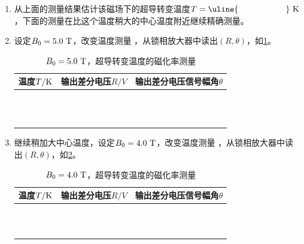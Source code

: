 \documentclass[11pt,a4paper]{ctexart}
\newcommand{\unit}[1]{\rm \ #1}
\begin{document}
\begin{enumerate}
 \item
 从上面的测量结果估计该磁场下的超导转变温度$T = \uline{\hspace{20mm}}\unit{K}$，下面的测量在比这个温度稍大的中心温度附近继续精确测量。
   \item
设定$B_0 = 5.0\unit{T}$，改变温度测量 ，从锁相放大器中读出$(R,\theta)$，如\cref{table5}。
  \begin{table}[H]
\centering
\caption{$B_0 = 5.0\unit{T}$，超导转变温度的磁化率测量\label{table5}}
\begin{tabular}{|p{32mm}|p{32mm}|p{32mm}|}
\hline
温度$T/{\rm K}$ & 输出差分电压$R/{V}$ & 输出差分电压信号幅角$\theta$ \\ \hline
& & \\ \hline
  & & \\ \hline
& & \\ \hline
   & & \\ \hline
    & & \\ \hline
 & & \\ \hline
  &  &\\ \hline
  &  &\\ \hline
  &  &\\ \hline
  &  &\\ \hline
  &  &\\ \hline
  &  &\\ \hline
  \end{tabular}
  \end{table}
     \item
继续稍加大中心温度，设定$B_0 = 4.0\unit{T}$，改变温度测量 ，从锁相放大器中读出$(R,\theta)$，如\cref{table6}。
  \begin{table}[H]
\centering
\caption{$B_0 = 4.0\unit{T}$，超导转变温度的磁化率测量\label{table6}}
\begin{tabular}{|p{32mm}|p{32mm}|p{32mm}|}
\hline
温度$T/{\rm K}$ & 输出差分电压$R/{V}$ & 输出差分电压信号幅角$\theta$ \\ \hline
& & \\ \hline
  & & \\ \hline
& & \\ \hline
   & & \\ \hline
    & & \\ \hline
 & & \\ \hline
  &  &\\ \hline
  &  &\\ \hline
  &  &\\ \hline
  &  &\\ \hline
  &  &\\ \hline

\end{tabular}
\end{table}
\end{enumerate}
\end{document}
